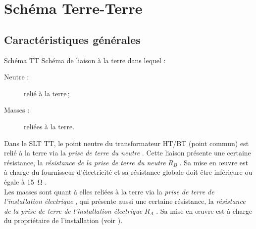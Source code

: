

\begin{comment}

\documentclass[a4paper, 11pt, twoside, fleqn]{memoir}

\usepackage{AOCDTF}

\marqueurchapitre
\decoupagechapitre{1} %


	\openleft %

\end{comment}

\chapter{Schéma Terre-Terre}
\ChapFrame

\section{Caractéristiques générales}

\begin{definition}{Schéma TT}{}
Schéma de liaison à la terre dans lequel :
\begin{description}
\item[Neutre :] relié à la terre\,;
\item[Masses :] reliées à la terre.
\end{description}
\end{definition}

Dans le SLT TT, le point neutre du transformateur HT/BT (point commun) est relié à la terre via la \emph{prise de terre du neutre} . Cette liaison présente une certaine résistance, la \emph{résistance de la prise de terre du neutre} $R_B$ . Sa mise en \oe{}uvre est à charge du fournisseur d'électricité et sa résistance globale doit être inférieure ou égale à \SI{15}{\ohm} \supercite{NF:C13-100-2015}.\\
Les masses sont quant à elles reliées à la terre via la \emph{prise de terre de l'installation électrique} , qui présente aussi une certaine résistance, la \emph{résistance de la prise de terre de l'installation électrique} $R_A$ . Sa mise en \oe{}uvre est à charge du propriétaire de l'installation (voir ).\\ 

